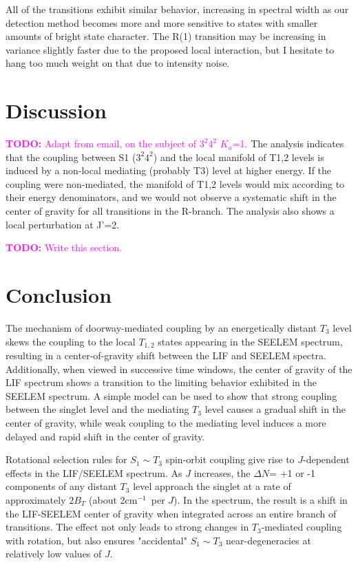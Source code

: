 \documentclass[12pt,draft]{mitthesis}
\newcommand{\TODO} [1]{\textcolor{magenta}{\textbf{TODO:} #1}}
\newcommand{\rcm}{cm$^{-1}$}
\begin{document}
All of the transitions exhibit similar behavior, increasing in
spectral width as our detection method becomes more and more sensitive
to states with smaller amounts of bright state character.  The R(1)
transition may be increasing in variance slightly faster due to the
proposed local interaction, but I hesitate to hang too much weight on
that due to intensity noise.

\section{Discussion}

\TODO{Adapt from email, on the subject of $3^2 4^2$ $K_a$=1.}  The
analysis indicates that the coupling between S1 ($3^2 4^2$) and the
local manifold of T1,2 levels is induced by a non-local mediating
(probably T3) level at higher energy.  If the coupling were
non-mediated, the manifold of T1,2 levels would mix according to their
energy denominators, and we would not observe a systematic shift in
the center of gravity for all transitions in the R-branch.  The
analysis also shows a local perturbation at J'=2.

\TODO{Write this section.}

\section{Conclusion}

The mechanism of doorway-mediated coupling by an energetically distant
$T_3$ level skews the coupling to the local $T_{1,2}$ states appearing
in the SEELEM spectrum, resulting in a center-of-gravity shift between
the LIF and SEELEM spectra.  Additionally, when viewed in successive
time windows, the center of gravity of the LIF spectrum shows a
transition to the limiting behavior exhibited in the SEELEM spectrum.
A simple model can be used to show that strong coupling between the
singlet level and the mediating $T_3$ level causes a gradual shift in
the center of gravity, while weak coupling to the mediating level
induces a more delayed and rapid shift in the center of gravity.

Rotational selection rules for $S_1 \sim T_3$ spin-orbit coupling give
rise to $J$-dependent effects in the LIF/SEELEM spectrum.  As $J$
increases, the $\Delta N$= +1 or -1 components of any distant $T_3$
level approach the singlet at a rate of approximately $2B_T$ (about
2\rcm\ per $J$).  In the spectrum, the result is a shift in the
LIF-SEELEM center of gravity when integrated across an entire branch
of transitions.  The effect not only leads to strong changes in
$T_3$-mediated coupling with rotation, but also ensures "accidental"
$S_1 \sim T_3$ near-degeneracies at relatively low values of $J$.
\end{document}
